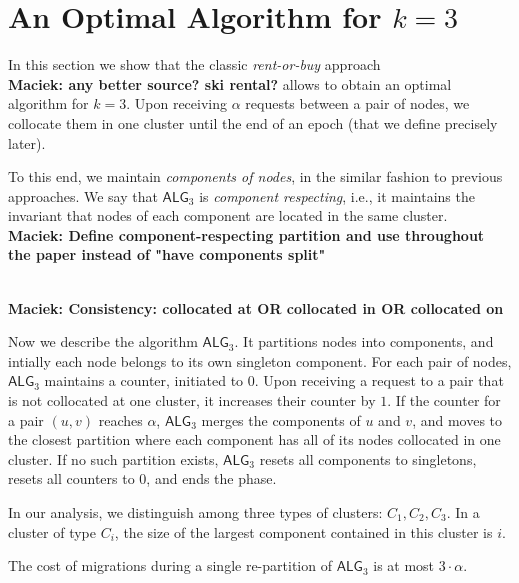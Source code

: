 \documentclass[manuscript,screen=true]{acmart}
\newcommand{\TAlg}{{\ensuremath{\textsf{ALG}_{3}}}\xspace} %
\newcommand\maciek[1]{\color{brown}\textbf{\\ Maciek: #1}\color{black}}
\begin{document}
\section{An Optimal Algorithm for $k=3$}
\label{sec:k3}

In this section we show that the classic \emph{rent-or-buy} approach\cite{borodin-book}\maciek{any better source? ski rental?} allows to obtain an optimal algorithm for $k=3$.
Upon receiving $\alpha$ requests between a pair of nodes, we collocate them in one cluster until the end of an epoch (that we define precisely later).

To this end, we maintain \emph{components of nodes}, in the similar fashion to previous approaches\cite{repartition-disc}.
We say that \TAlg is \emph{component respecting}, i.e., it maintains the invariant that nodes of each component are located in the same cluster.
\maciek{Define component-respecting partition and use throughout the paper instead of "have components split"}

\maciek{Consistency: collocated at OR collocated in OR collocated on}

Now we describe the algorithm \TAlg.
It partitions nodes into components, and
intially each node belongs to its own singleton component.
For each pair of nodes, \TAlg maintains a counter, initiated to $0$. 
Upon receiving a request to a pair that is not collocated at one cluster, it increases their counter by $1$.
If the counter for a pair $(u,v)$ reaches $\alpha$, \TAlg merges the components of $u$ and $v$, and moves to the closest partition where each component has all of its nodes collocated in one cluster.
If no such partition exists, \TAlg resets all components to singletons, resets all counters to $0$, and ends the phase.




In our analysis, we distinguish among three types of clusters: $C_1, C_2, C_3$. In a cluster of type $C_i$, the size of the largest component contained in this cluster is $i$.

\begin{lemma}
  \label{lem:1req}
  The cost of migrations during a single re-partition of \TAlg is at most $3\cdot\alpha$.
\end{lemma}
\end{document}
